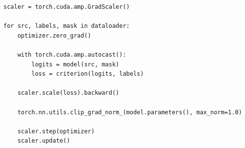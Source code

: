 \begin{listing}
    \begin{verbatim}
scaler = torch.cuda.amp.GradScaler()

for src, labels, mask in dataloader:
    optimizer.zero_grad()

    with torch.cuda.amp.autocast():
        logits = model(src, mask)
        loss = criterion(logits, labels)

    scaler.scale(loss).backward()

    torch.nn.utils.clip_grad_norm_(model.parameters(), max_norm=1.0)

    scaler.step(optimizer)
    scaler.update()
    \end{verbatim}
    \caption{Optimizing Transformer Training with Gradient Clipping and Mixed Precision}
    \label{lst:transformer_optimizations}
\end{listing}

